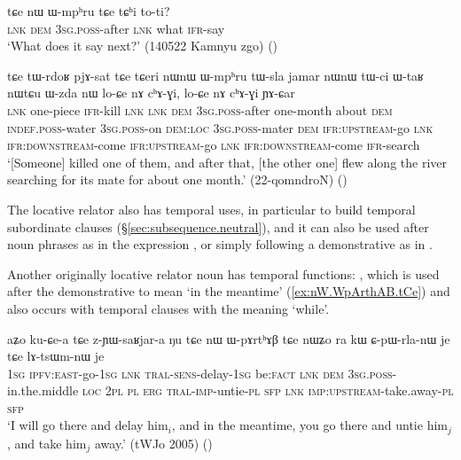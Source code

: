 \begin{exe}
\ex \label{ex:nW.Wmphru.tCe}
 \gll  tɕe nɯ ɯ-mpʰru tɕe tɕʰi to-ti? \\
 \textsc{lnk} \textsc{dem} \textsc{3sg}.\textsc{poss}-after \textsc{lnk} what \textsc{ifr}-say \\
\glt `What does it say next?' (140522 Kamnyu zgo) ()
\end{exe}

\begin{exe}
\ex \label{ex:nWnW.Wmphru.tWsla}
 \gll tɕe tɯ-rdoʁ pjɤ-sat tɕe tɕeri nɯnɯ ɯ-mpʰru tɯ-sla jamar nɯnɯ tɯ-ci ɯ-taʁ nɯtɕu ɯ-zda nɯ lo-ɕe nɤ cʰɤ-ɣi, lo-ɕe nɤ cʰɤ-ɣi ɲɤ-ɕar \\
\textsc{lnk} one-piece \textsc{ifr}-kill \textsc{lnk} \textsc{lnk} \textsc{dem} \textsc{3sg}.\textsc{poss}-after one-month about \textsc{dem} \textsc{indef}.\textsc{poss}-water \textsc{3sg}.\textsc{poss}-on \textsc{dem}:\textsc{loc} \textsc{3sg}.\textsc{poss}-mater \textsc{dem} \textsc{ifr}:\textsc{upstream}-go \textsc{lnk} \textsc{ifr}:\textsc{downstream}-come  \textsc{ifr}:\textsc{upstream}-go \textsc{lnk} \textsc{ifr}:\textsc{downstream}-come \textsc{ifr}-search \\
\glt `[Someone] killed one of them, and after that, [the other one] flew along the river searching for its mate for about one month.' (22-qomndroN)
()
\end{exe}

The locative relator  also has temporal uses, in particular to build temporal subordinate clauses (§\ref{sec:subsequence.neutral}), and it can also be used after noun phrases as in the expression , or simply following a demonstrative as in .

Another originally locative relator noun has temporal functions: , which is used after the demonstrative  to mean `in the meantime'  (\ref{ex:nW.WpArthAB.tCe}) and also occurs with temporal clauses with the meaning `while'.

\begin{exe}
\ex \label{ex:nW.WpArthAB.tCe}
\gll aʑo ku-ɕe-a tɕe z-ɲɯ-saʁjar-a ŋu tɕe nɯ ɯ-pɤrtʰɤβ tɕe nɯʑo ra kɯ ɕ-pɯ-rla-nɯ je tɕe lɤ-tsɯm-nɯ je \\
\textsc{1sg} \textsc{ipfv}:\textsc{east}-go-\textsc{1sg} \textsc{lnk} \textsc{tral}-\textsc{sens}-delay-\textsc{1sg} be:\textsc{fact} \textsc{lnk} \textsc{dem} \textsc{3sg}.\textsc{poss}-in.the.middle \textsc{loc} \textsc{2pl} \textsc{pl} \textsc{erg} \textsc{tral}-\textsc{imp}-untie-\textsc{pl} \textsc{sfp} \textsc{lnk} \textsc{imp}:\textsc{upstream}-take.away-\textsc{pl} \textsc{sfp} \\
\glt `I will go there and delay him$_i$, and in the meantime, you go there and untie him$_j$, and take him$_j$ away.' (tWJo 2005)
()
\end{exe}

